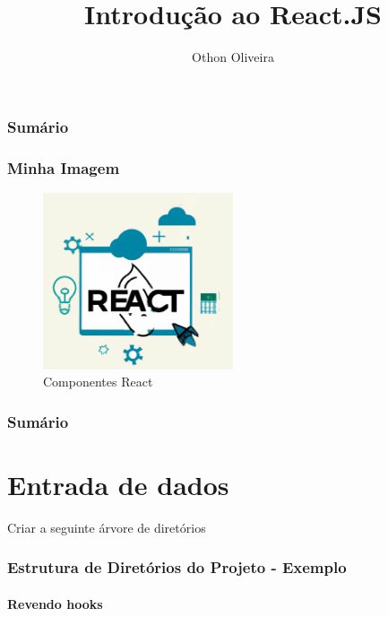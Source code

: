 \documentclass[13pt, xcolor={dvipsnames,svgnames}, portuguese]{beamer}
\author{Othon Oliveira}
\title{Introdução ao React.JS}
\institute{SENAC - PROA}
\date{}
\begin{document}
\begin{frame}
\titlepage
\end{frame}

\newcommand{\capa}{
    \begin{tikzpicture}[remember picture,overlay]
        \node at (current page.south west)
            {\begin{tikzpicture}[remember picture, overlay]
                \fill[shading=radial,top color=orange,bottom color=orange,middle color=yellow] (0,0) rectangle (\paperwidth,\paperheight);
            \end{tikzpicture}
          };
    \end{tikzpicture}
}


\begin{frame}\frametitle{Sumário}
\tableofcontents
\end{frame}
\begin{frame}
\frametitle{Minha Imagem}
\begin{figure}
\centering
\includegraphics[width=0.5\textwidth]{Figuras/react1.png}
\caption{Componentes React}
\end{figure}
\end{frame}
\begin{frame}\frametitle{Sumário}
\tableofcontents
\end{frame}


\section{Entrada de dados}
\begin{frame}{Criar a seguinte árvore de diretórios}
\frametitle{Estrutura de Diretórios do Projeto - Exemplo}
\framesubtitle{Revendo hooks}

\end{frame}
\end{document}

